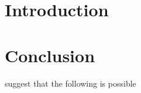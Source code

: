

\newcommand{\courseName}{Subject Title}
\newcommand{\courseCode}{ELEC ENG 7112}
\newcommand{\dueDate}{01/01/2023}
\newcommand{\supervisors}{AsPr. Brian Ng}
\newcommand{\submissionType}{Signal Processing and Applications}
\newcommand{\submissionTitle}{Practical Report 1\\ Signal Processing Systems}
\newcommand{\headerTitle}{Signal Processing Practical 1}




\FloatBarrier

\section{Introduction}
\FloatBarrier





\clearpage\section{Conclusion}
\FloatBarrier


\cite{Holdsworth2020} suggest that the following is possible

\autocite{fabrizioHighFrequencyHorizon2013}
    

\clearpage
\printbibliography %



